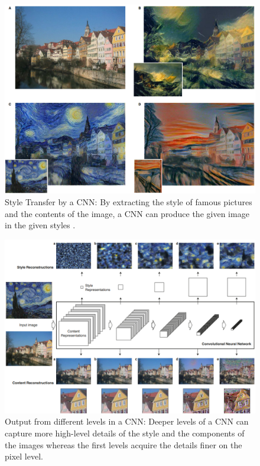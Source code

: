 \begin{figure}[tbh]
  \centering
    \includegraphics[width=\linewidth]{abbildungen/styleTrans.png}
  \caption{Style Transfer by a CNN: By extracting the style of famous pictures and the contents of the image, a CNN can produce the given image in the given styles \cite{convImgStyle}.} 
  \label{fig:styleTrans} 
\end{figure}

\begin{figure}[tbh]
  \centering
    \includegraphics[width=\linewidth]{abbildungen/cnnLevel.png}
  \caption{Output from different levels in a CNN: Deeper levels of a CNN can capture more high-level details of the style and the components of the images whereas the first levels acquire the details finer on the pixel level.} 
  \label{fig:cnnLevel} 
\end{figure}


